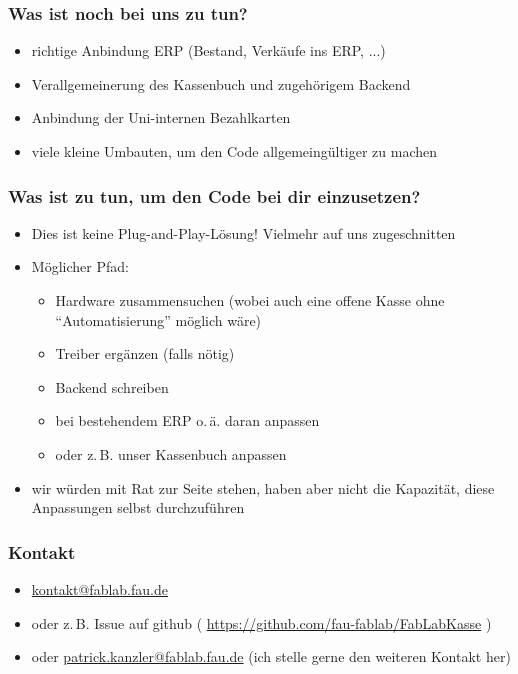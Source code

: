 \documentclass[german]{beamer} %
\begin{document}
\begin{frame}
\frametitle{Was ist noch bei uns zu tun?}
 \begin{itemize}
   \item richtige Anbindung ERP (Bestand, Verkäufe ins ERP, ...)
   \item Verallgemeinerung des Kassenbuch und zugehörigem Backend
   \item Anbindung der Uni-internen Bezahlkarten
   \item viele kleine Umbauten, um den Code allgemeingültiger zu machen
 \end{itemize} 
\end{frame}

\begin{frame}
\frametitle{Was ist zu tun, um den Code bei dir einzusetzen?}
  \begin{itemize}
    \item Dies ist keine Plug-and-Play-Lösung! Vielmehr auf uns zugeschnitten
    \item Möglicher Pfad:
      \begin{itemize}
         \item Hardware zusammensuchen (wobei auch eine offene Kasse ohne \enquote{Automatisierung} möglich wäre)
         \item Treiber ergänzen (falls nötig)
         \item Backend schreiben
         \item bei bestehendem ERP o.\,ä. daran anpassen
         \item oder z.\,B. unser Kassenbuch anpassen
      \end{itemize}
    \item wir würden mit Rat zur Seite stehen, haben aber nicht die Kapazität, diese Anpassungen selbst durchzuführen
  \end{itemize}
\end{frame}

\begin{frame}
\frametitle{Kontakt}
 \begin{itemize}
  \item \url{kontakt@fablab.fau.de}
  \item oder z.\,B. Issue auf github ( \url{https://github.com/fau-fablab/FabLabKasse} )
  \item oder \url{patrick.kanzler@fablab.fau.de} (ich stelle gerne den weiteren Kontakt her)
 \end{itemize}
\end{frame}
\end{document}
